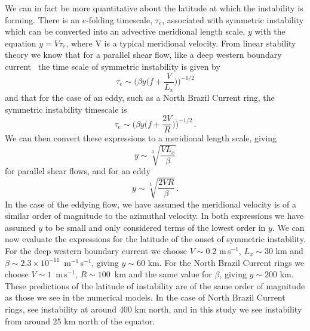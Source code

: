 We can in fact be more quantitative about the latitude at which the instability is forming. There is an $e$-folding timescale, $\tau_e$, associated with symmetric instability which can be converted into an advective meridional length scale, $y$ with the equation $y = V \tau_e$, where V is a typical meridional velocity. From linear stability theory we know that for a parallel shear flow, like a deep western boundary current~\citep{Hoskins1974} the time scale of symmetric instability is given by
\begin{equation}
    \tau_e \sim \Bigg(\beta y \bigg(f + \frac{V}{L_x}\bigg) \Bigg)^{-1/2}
\end{equation}
and that for the case of an eddy, such as a North Brazil Current ring, the symmetric instability timescale is~\citep{Buckingham2021}
\begin{equation}
    \tau_e \sim \Bigg(\beta y \bigg(f + \frac{2 V}{R}\bigg) \Bigg)^{-1/2} \, .
\end{equation}
We can then convert these expressions to a meridional length scale, giving
\begin{equation}
    y \sim \sqrt[3]{\frac{V L_x}{\beta}}
    \label{eq:dwbc_y}
\end{equation}
for parallel shear flows, and for an eddy
\begin{equation}
    y \sim \sqrt[3]{\frac{2 V R}{\beta}} \, .
    \label{eq:nbc_y}
\end{equation}
In the case of the eddying flow, we have assumed the meridional velocity is of a similar order of magnitude to the azimuthal velocity. In both expressions we have assumed $y$ to be small and only considered terms of the lowest order in $y$. We can now evaluate the expressions for the latitude of the onset of symmetric instability. For the deep western boundary current we choose $V \sim 0.2$ m\,s$^{-1}$, $L_x \sim 30$ km and $\beta \sim 2.3 \times 10^{-11}$~m$^{-1}$\,s$^{-1}$, giving $y \sim 60$ km. For the North Brazil Current rings we choose $V \sim 1$~m\,s$^{-1}$, $R \sim 100$~km and the same value for $\beta$, giving $y \sim 200$ km. These predictions of the latitude of instability are of the same order of magnitude as those we see in the numerical models. In the case of North Brazil Current rings, \citet{Goldsworth2021} see instability at around 400 km north, and in this study we see instability from around 25 km north of the equator.

